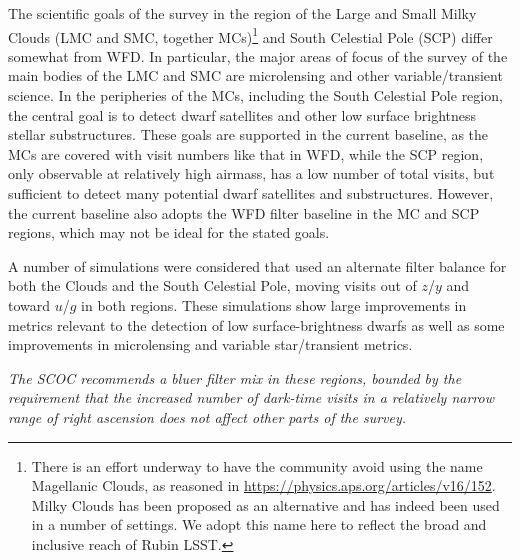 The scientific goals of the survey in the region of the Large and Small Milky Clouds (LMC and SMC, together MCs)\footnote{There is an effort underway to have the community avoid using the name Magellanic Clouds, as reasoned in \url{https://physics.aps.org/articles/v16/152}. Milky Clouds has been proposed as an alternative and has indeed been used in a number of settings. We adopt this name here to reflect the broad and inclusive reach of Rubin LSST.} and South Celestial Pole (SCP) differ somewhat from WFD. In particular, the major areas of focus of the survey of the main bodies of the LMC and SMC are microlensing and other variable/transient science. In the peripheries of the MCs, including the South Celestial Pole region, the central goal is to detect dwarf satellites and other low surface brightness stellar substructures.
These goals are supported in the current baseline, as the MCs are covered with visit numbers like that in WFD, while the SCP region, only observable at relatively high airmass, has a low number of total visits, but sufficient to detect many potential dwarf satellites and substructures. However, the current baseline also adopts the WFD filter baseline in the MC and SCP regions, which may not be ideal for the stated goals.


A number of simulations were considered that used an alternate filter balance for both the Clouds and the South Celestial Pole, moving visits out of $z$/$y$ and toward $u$/$g$ in both regions. These simulations show large improvements in metrics relevant to the detection of low surface-brightness dwarfs as well as some improvements in microlensing and variable star/transient metrics. 

{\it The SCOC recommends a bluer filter mix in these regions, bounded by the requirement that the increased number of dark-time visits in a relatively narrow range of right ascension does not affect other parts of the survey.} 

